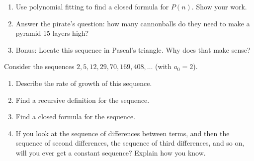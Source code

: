 \documentclass[11pt,]{book}
\theoremstyle{ptxplainnotitle}
\theoremstyle{ptxplaintitle}
\theoremstyle{ptxdefinitionnotitle}
\theoremstyle{ptxdefinitiontitle}
\theoremstyle{ptxdefinitionnotitle}
\theoremstyle{ptxdefinitiontitle}
\theoremstyle{ptxdefinitionnotitle}
\theoremstyle{ptxdefinitiontitle}
\theoremstyle{ptxdefinitiontitlenonumber}
\theoremstyle{ptxdefinitiontitlenonumber}
\numberwithin{equation}{chapter}
\begin{document}
\begin{divisionexercise}{12}
\begin{enumerate}[label=(\alph*)]
\item\hypertarget{li-211}{}\hypertarget{p-409}{}%
Use polynomial fitting to find a closed formula for \(P(n)\). Show your work. %
\item\hypertarget{li-212}{}\hypertarget{p-410}{}%
Answer the pirate's question: how many cannonballs do they need to make a pyramid 15 layers high? %
\item\hypertarget{li-213}{}\hypertarget{p-411}{}%
Bonus: Locate this sequence in Pascal's triangle. Why does that make sense?%
\end{enumerate}
%
\end{divisionexercise}%
\begin{divisionexercise}{13}\hypertarget{exercise-41}{}
\hypertarget{p-412}{}%
Consider the sequences \(2, 5, 12, 29, 70, 169, 408,\ldots\) (with \(a_0 = 2\)). \leavevmode%
\begin{enumerate}[label=(\alph*)]
\item\hypertarget{li-214}{}\hypertarget{p-413}{}%
Describe the rate of growth of this sequence. %
\item\hypertarget{li-215}{}\hypertarget{p-414}{}%
Find a recursive definition for the sequence. %
\item\hypertarget{li-216}{}\hypertarget{p-415}{}%
Find a closed formula for the sequence. %
\item\hypertarget{li-217}{}\hypertarget{p-416}{}%
If you look at the sequence of differences between terms, and then the sequence of second differences, the sequence of third differences, and so on, will you ever get a constant sequence? Explain how you know. %
\end{enumerate}
%
\end{divisionexercise}%
\typeout{************************************************}
\typeout{************************************************}
\end{document}
